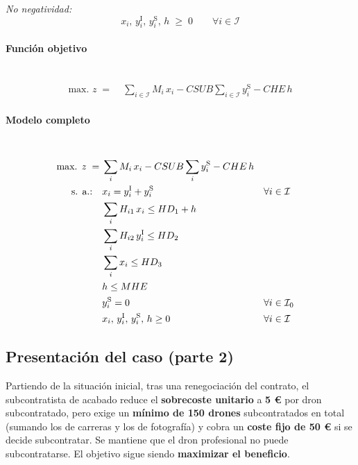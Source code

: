 \textit{No negatividad:}
\begin{equation}
x_i,\, y_i^{\mathrm{I}},\, y_i^{\mathrm{S}},\, h \;\geq\; 0 \qquad \forall i \in \mathcal{I}
\end{equation}

\paragraph{Función objetivo}\mbox{}\\
\begin{align}
\mbox{max. } z \;=\;&
\sum_{i \in \mathcal{I}} M_i\,x_i
- CSUB \sum_{i \in \mathcal{I}} y_i^{\mathrm{S}}
- CHE\,h
\end{align}

\paragraph{Modelo completo}\mbox{}\\[-1mm]
\begin{align}
\mbox{max. } z \;=\;&
\sum_i M_i\,x_i
- CSUB \sum_i y_i^{\mathrm{S}}
- CHE\,h \notag\\
\mbox{s. a.:}\quad
& x_i = y_i^{\mathrm{I}} + y_i^{\mathrm{S}} && \forall i \in \mathcal{I} \notag\\
& \sum_i H_{i1}\,x_i \leq HD_1 + h \notag\\
& \sum_i H_{i2}\,y_i^{\mathrm{I}} \leq HD_2 \notag\\
& \sum_i x_i \leq HD_3 \notag\\
& h \leq MHE \notag\\
& y_i^{\mathrm{S}} = 0 && \forall i \in \mathcal{I}_0 \notag\\
& x_i,\, y_i^{\mathrm{I}},\, y_i^{\mathrm{S}},\, h \geq 0 && \forall i \in \mathcal{I} \notag
\end{align}



\subsection{Presentación del caso (parte 2)}

Partiendo de la situación inicial, tras una renegociación del contrato, el subcontratista de acabado reduce el \textbf{sobrecoste unitario} a \textbf{5 €} por dron subcontratado, pero exige un \textbf{mínimo de 150 drones} subcontratados en total (sumando los de carreras y los de fotografía) y cobra un \textbf{coste fijo de 50 €} si se decide subcontratar. Se mantiene que el dron profesional no puede subcontratarse. El objetivo sigue siendo \textbf{maximizar el beneficio}.


